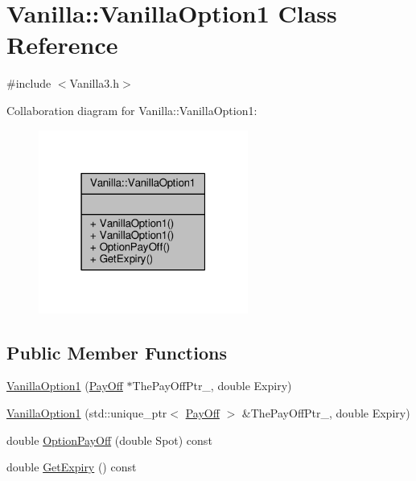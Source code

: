 \hypertarget{classVanilla_1_1VanillaOption1}{}\section{Vanilla\+:\+:Vanilla\+Option1 Class Reference}
\label{classVanilla_1_1VanillaOption1}


{\ttfamily \#include $<$Vanilla3.\+h$>$}



Collaboration diagram for Vanilla\+:\+:Vanilla\+Option1\+:
\nopagebreak
\begin{figure}[H]
\begin{center}
\leavevmode
\includegraphics[width=195pt]{classVanilla_1_1VanillaOption1__coll__graph}
\end{center}
\end{figure}
\subsection*{Public Member Functions}
\begin{DoxyCompactItemize}
\item 
\hyperlink{classVanilla_1_1VanillaOption1_ae5c50e3421d7dfbe95dfecddc5f5ea07}{Vanilla\+Option1} (\hyperlink{classPayOff}{Pay\+Off} $\ast$The\+Pay\+Off\+Ptr\+\_\+, double Expiry)
\item 
\hyperlink{classVanilla_1_1VanillaOption1_a9091b6dab572b9856fb318d8e35849f1}{Vanilla\+Option1} (std\+::unique\+\_\+ptr$<$ \hyperlink{classPayOff}{Pay\+Off} $>$ \&The\+Pay\+Off\+Ptr\+\_\+, double Expiry)
\item 
double \hyperlink{classVanilla_1_1VanillaOption1_a6af5c93fb6a395dbf329fd17f7bee2ad}{Option\+Pay\+Off} (double Spot) const
\item 
double \hyperlink{classVanilla_1_1VanillaOption1_a868ff90c27c93d8d58fe94ff512010b2}{Get\+Expiry} () const
\end{DoxyCompactItemize}


